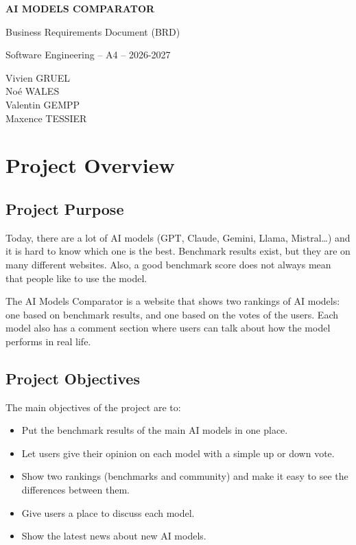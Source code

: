\documentclass[11pt,a4paper]{article}
\newcommand{\product}{AI Models Comparator}
\newcommand{\team}{Vivien GRUEL \\ Noé WALES \\ Valentin GEMPP \\ Maxence TESSIER}
\begin{document}
\begin{titlepage}
  \centering
  \vspace*{4cm}
  {\Huge\bfseries \MakeUppercase{\product}\par}
  \vspace{1.5cm}
  {\LARGE Business Requirements Document (BRD)\par}
  \vspace{4cm}
  {\large Software Engineering -- A4 -- 2026-2027\par}
  \vspace{1cm}
  {\large \team\par}
  \vfill
\end{titlepage}

\tableofcontents
\newpage

\section{Project Overview}

\subsection{Project Purpose}

Today, there are a lot of AI models (GPT, Claude, Gemini, Llama, Mistral\dots) and it is hard to know which one is the best. Benchmark results exist, but they are on many different websites. Also, a good benchmark score does not always mean that people like to use the model.

The \product{} is a website that shows two rankings of AI models: one based on benchmark results, and one based on the votes of the users. Each model also has a comment section where users can talk about how the model performs in real life.

\subsection{Project Objectives}

The main objectives of the project are to:
\begin{itemize}
  \item Put the benchmark results of the main AI models in one place.
  \item Let users give their opinion on each model with a simple up or down vote.
  \item Show two rankings (benchmarks and community) and make it easy to see the differences between them.
  \item Give users a place to discuss each model.
  \item Show the latest news about new AI models.
\end{itemize}
\end{document}
